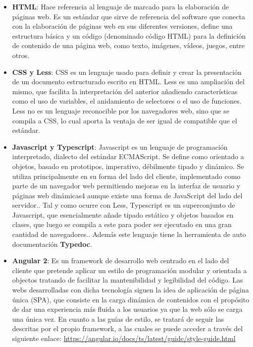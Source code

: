 \documentclass{article}
\begin{document}
            \begin{itemize}
            	\item \textbf{HTML}: Hace referencia al lenguaje de marcado para la elaboración de páginas web. Es un estándar que sirve de referencia del software que conecta con la elaboración de páginas web en sus diferentes versiones, define una estructura básica y un código (denominado código HTML) para la definición de contenido de una página web, como texto, imágenes, vídeos, juegos, entre otros. \cite{wikipedia:html}

            	\item \textbf{CSS y Less}: CSS es un lenguaje usado para definir y crear la presentación de un documento estructurado escrito en HTML.\cite{wikipedia:css} Less es una ampliación del mismo, que facilita la interpretación del anterior añadiendo características como el uso de variables, el anidamiento de selectores o el uso de funciones. Less no es un lenguaje reconocible por los navegadores web, sino que se compila a CSS, lo cual aporta la ventaja de ser igual de compatible que el estándar.\cite{wikipedia:less}

            	\item \textbf{Javascript y Typescript}: Javascript es un lenguaje de programación interpretado, dialecto del estándar ECMAScript. Se define como orientado a objetos, basado en prototipos, imperativo, débilmente tipado y dinámico. Se utiliza principalmente en su forma del lado del cliente, implementado como parte de un navegador web permitiendo mejoras en la interfaz de usuario y páginas web dinámicas4 aunque existe una forma de JavaScript del lado del servidor.\cite{wikipedia:javascript}. Tal y como ocurre con Less, Typescript es un superconjunto de Javascript, que esencialmente añade tipado estático y objetos basados en clases, que luego se compila a este para poder ser ejecutado en una gran cantidad de navegadores.\cite{wikipedia:typescript}. Además este lenguaje tiene la herramienta de auto documentación \textbf{Typedoc}.

            	\item \textbf{Angular 2}: Es un framework de desarrollo web centrado en el lado del cliente que pretende aplicar un estilo de programación modular y orientada a objectos tratando de facilitar la mantenibilidad y legibilidad del código. Las webs desarrolladas con dicha tecnología siguen la idea de aplicación de página única (SPA), que consiste en la carga dinámica de contenidos con el propósito de dar una experiencia más fluida a los usuarios ya que la web sólo se carga una única vez. En cuanto a las guías de estilo, se tratará de seguir las descritas por el propio framework, a las cuales se puede acceder a través del siguiente enlace: \url{https://angular.io/docs/ts/latest/guide/style-guide.html}
                

\end{itemize}
\end{document}
